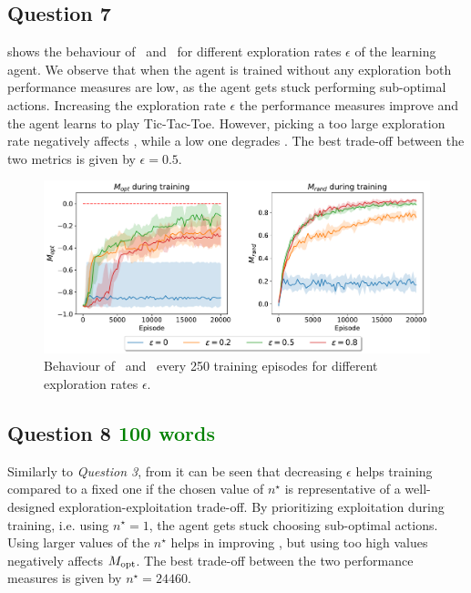 \documentclass[10pt]{IEEEtran}
\begin{document}
\subsection*{Question 7}
 shows the behaviour of \mopt\ and \mrand\ for different exploration rates $\epsilon$ of the learning agent. We observe that when the agent is trained without any exploration both performance measures are low, as the agent gets stuck performing sub-optimal actions. Increasing the exploration rate $\epsilon$ the performance measures improve and the agent learns to play Tic-Tac-Toe. However, picking a too large exploration rate negatively affects \mopt, while a low one degrades \mrand. The best trade-off between the two metrics is given by $\epsilon = 0.5$.
\begin{figure}[h]
    \centering
    \includegraphics[width=\linewidth]{code/figures/performance_epsilon_self.pdf}
    \caption{Behaviour of \mopt\ and \mrand\ every 250 training episodes for different exploration rates $\epsilon$.}
    \label{plot_question7}
\end{figure}


\subsection*{Question 8  \textcolor{Green}{100 words}}
Similarly to \emph{Question 3}, from  it can be seen that decreasing $\epsilon$ helps training compared to a fixed one if the chosen value of $n^{\star}$ is representative of a well-designed exploration-exploitation trade-off. By prioritizing exploitation during training, i.e. using $n^{\star} = 1$, the agent gets stuck choosing sub-optimal actions. Using larger values of the $n^{\star}$ helps in improving \mrand, but using too high values negatively affects $M_{\text{opt}}$. The best trade-off between the two performance measures is given by $n^{\star} = 24460$.  
\end{document}
